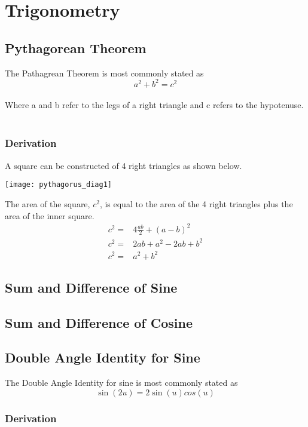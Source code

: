 \documentclass[11pt]{book}
\begin{document}
\chapter{Trigonometry}

\section{Pythagorean Theorem}
The Pathagrean Theorem is most commonly stated as
\[a^2 + b^2 = c^2\]
\\
Where a and b refer to the legs of a right triangle and c refers to the hypotenuse.\\
\\
\subsection{Derivation}
A square can be constructed of 4 right triangles as shown below.\\
\begin{center}
\texttt{[image: pythagorus\_diag1]}
\end{center}
The area of the square, \(c^2\), is equal to the area of the 4 right triangles plus the area of the inner square.\\

\begin{align*}
c^2 =& 4\frac{ab}{2} + (a-b)^2\\
c^2 =& 2ab + a^2 -2ab + b^2 \\
c^2 =& a^2 + b^2
\end{align*}

\section{Sum and Difference of Sine}

\section{Sum and Difference of Cosine}

\section{Double Angle Identity for Sine}
The Double Angle Identity for sine is most commonly stated as
\[\sin{(2u)} = 2\sin{(u)}cos{(u)}\]

\subsection{Derivation}
\end{document}
